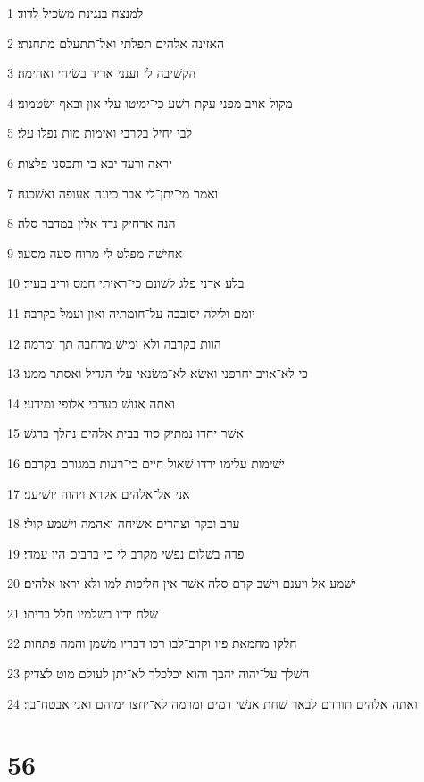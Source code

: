 \par 1 למנצח בנגינת משׂכיל לדוד׃
\par 2 האזינה אלהים תפלתי ואל־תתעלם מתחנתי׃
\par 3 הקשׁיבה לי וענני אריד בשׂיחי ואהימה׃
\par 4 מקול אויב מפני עקת רשׁע כי־ימיטו עלי און ובאף ישׂטמוני׃
\par 5 לבי יחיל בקרבי ואימות מות נפלו עלי׃
\par 6 יראה ורעד יבא בי ותכסני פלצות׃
\par 7 ואמר מי־יתן־לי אבר כיונה אעופה ואשׁכנה׃
\par 8 הנה ארחיק נדד אלין במדבר סלה׃
\par 9 אחישׁה מפלט לי מרוח סעה מסער׃
\par 10 בלע אדני פלג לשׁונם כי־ראיתי חמס וריב בעיר׃
\par 11 יומם ולילה יסובבה על־חומתיה ואון ועמל בקרבה׃
\par 12 הוות בקרבה ולא־ימישׁ מרחבה תך ומרמה׃
\par 13 כי לא־אויב יחרפני ואשׂא לא־משׂנאי עלי הגדיל ואסתר ממנו׃
\par 14 ואתה אנושׁ כערכי אלופי ומידעי׃
\par 15 אשׁר יחדו נמתיק סוד בבית אלהים נהלך ברגשׁ׃
\par 16 ישׁימות עלימו ירדו שׁאול חיים כי־רעות במגורם בקרבם׃
\par 17 אני אל־אלהים אקרא ויהוה יושׁיעני׃
\par 18 ערב ובקר וצהרים אשׂיחה ואהמה וישׁמע קולי׃
\par 19 פדה בשׁלום נפשׁי מקרב־לי כי־ברבים היו עמדי׃
\par 20 ישׁמע אל ויענם וישׁב קדם סלה אשׁר אין חליפות למו ולא יראו אלהים׃
\par 21 שׁלח ידיו בשׁלמיו חלל בריתו׃
\par 22 חלקו מחמאת פיו וקרב־לבו רכו דבריו משׁמן והמה פתחות׃
\par 23 השׁלך על־יהוה יהבך והוא יכלכלך לא־יתן לעולם מוט לצדיק׃
\par 24 ואתה אלהים תורדם לבאר שׁחת אנשׁי דמים ומרמה לא־יחצו ימיהם ואני אבטח־בך׃

\chapter{56}

